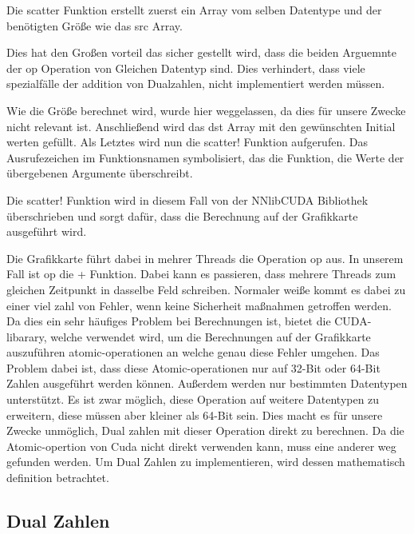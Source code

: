 
Die scatter Funktion erstellt zuerst ein Array vom selben Datentype und der benötigten Größe wie das src Array. 

Dies hat den Großen vorteil das sicher gestellt wird, dass die beiden Arguemnte der op Operation von Gleichen Datentyp sind. 
Dies verhindert, dass viele spezialfälle der addition von Dualzahlen, nicht implementiert werden müssen.

Wie die Größe berechnet wird, wurde hier weggelassen, da dies für unsere Zwecke nicht relevant ist. 
Anschließend wird das dst Array mit den gewünschten Initial werten gefüllt.
Als Letztes wird nun die scatter! Funktion aufgerufen.
Das Ausrufezeichen im Funktionsnamen symbolisiert, das die Funktion, die Werte der übergebenen Argumente überschreibt.

Die scatter! Funktion wird in diesem Fall von der NNlibCUDA Bibliothek überschrieben und sorgt dafür, 
dass die Berechnung auf der Grafikkarte ausgeführt wird.

Die Grafikkarte führt dabei in mehrer Threads die Operation op aus. In unserem Fall ist op die + Funktion.
Dabei kann es passieren, dass mehrere Threads zum gleichen Zeitpunkt in dasselbe Feld schreiben.
Normaler weiße kommt es dabei zu einer viel zahl von Fehler, wenn keine Sicherheit maßnahmen getroffen werden. 
Da dies ein sehr häufiges Problem bei Berechnungen ist, bietet die CUDA-libarary, 
welche verwendet wird, um die Berechnungen auf der Grafikkarte auszuführen atomic-operationen an
welche genau diese Fehler umgehen.
Das Problem dabei ist, dass diese Atomic-operationen nur auf 32-Bit oder 64-Bit Zahlen ausgeführt werden können.
Außerdem werden nur bestimmten Datentypen unterstützt.
Es ist zwar möglich, diese Operation auf weitere Datentypen zu erweitern, diese müssen aber kleiner als 64-Bit sein. 
Dies macht es für unsere Zwecke unmöglich, Dual zahlen mit dieser Operation direkt zu berechnen.
Da die Atomic-opertion von Cuda nicht direkt verwenden kann, muss eine anderer weg gefunden werden.
Um Dual Zahlen zu implementieren, wird dessen mathematisch definition betrachtet.

\subsection{Dual Zahlen}

